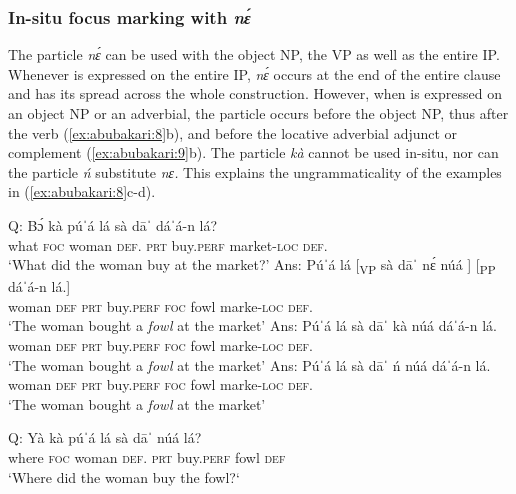 \documentclass[output=paper,modfonts,nonflat,
 hidelinks
]{langsci/langscibook}
\begin{document}
\subsubsection{In-situ focus marking with \textit{nɛ́}}

The particle \textit{nɛ́} can be used with the object NP, the VP as well as the entire IP. Whenever  is expressed on the entire IP, \textit{nɛ́} occurs at the end of the entire clause and has its  spread across the whole construction. However, when  is expressed on an object NP or an adverbial, the particle occurs before the object NP, thus after the verb (\ref{ex:abubakari:8}b), and before the locative adverbial adjunct or complement (\ref{ex:abubakari:9}b).  The particle \textit{kà} cannot be used in-situ, nor can the particle \textit{ń} substitute \textit{nɛ.} This explains the ungrammaticality of the examples in (\ref{ex:abubakari:8}c-d).

 
\ea\label{ex:abubakari:8}
\ea \label{ex:abubakari:8a} 
Q: \gll Bɔ́  kà  púˈá    lá  sà  dāˈ  dáˈá-n  lá?\\   
      what  \textsc{foc}   woman  \textsc{def}.  \textsc{prt}  buy.\textsc{perf}     market-\textsc{loc}  \textsc{def}. \\
 \glt   ‘What did the woman buy at the market?’
\ex \label{ex:abubakari:8b} 
Ans: \gll  Púˈá  lá   [\textsubscript{VP} sà  dāˈ    nɛ́  núá ]  [{\textsubscript{PP}} dáˈá-n    lá.]\\ 
             woman  \textsc{def} {}  \textsc{prt}  buy.\textsc{perf}  \textsc{foc}  fowl  {} {}  marke-\textsc{loc}  \textsc{def}.\\
 \glt ‘The woman bought a \textit{fowl} at the market’
 \ex \label{ex:abubakari:8c} 
Ans:  \gll *Púˈá  lá  sà  dāˈ    kà  núá  dáˈá-n    lá. \\
woman  \textsc{def}  \textsc{prt}  buy.\textsc{perf}  \textsc{foc}  fowl   marke-\textsc{loc}  \textsc{def}. \\
\glt     ‘The woman bought a \textit{fowl} at the market’
 \ex \label{ex:abubakari:8d} 
Ans:  \gll *Púˈá    lá     sà  dāˈ    ń  núá dáˈá-n  lá.\\
woman  \textsc{def}  \textsc{prt}  buy.\textsc{perf}  \textsc{foc}  fowl marke-\textsc{loc}   \textsc{def}. \\
\glt ‘The woman bought a \textit{fowl} at the market’
\z
\z
 
\ea\label{ex:abubakari:9}
\ea \label{ex:abubakari:9a} 
Q: \gll Yà  kà   púˈá    lá  sà  dāˈ                                                     núá  lá?\\
where  \textsc{foc}  woman  \textsc{def}.  \textsc{prt}  buy.\textsc{perf} fowl  \textsc{def}\\
\glt ‘Where did the woman buy the fowl?‘
 
\end{document}
